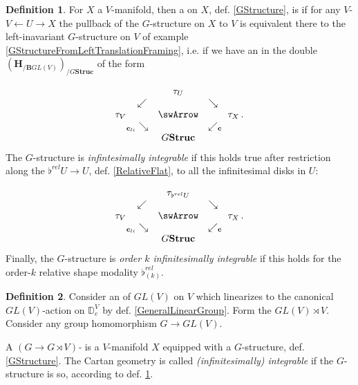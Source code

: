 \documentclass[12pt,titlepage]{article}
\def\mathllap{\mathpalette\mathllapinternal}
\def\mathrlap{\mathpalette\mathrlapinternal}
\def\mathllapinternal#1#2{\llap{$\mathsurround=0pt#1{#2}$}}
\def\mathrlapinternal#1#2{\rlap{$\mathsurround=0pt#1{#2}$}}
\newcommand{\itexarray}[1]{\begin{matrix}#1\end{matrix}}
\theoremstyle{plain}
\theoremstyle{definition}
\newtheorem{defn}{Definition}
\theoremstyle{remark}
\begin{document}
\begin{defn}
\label{IntegrabilityOfGStructure}\hypertarget{IntegrabilityOfGStructure}{}
For $X$ a $V$-manifold, then a  on $X$, def. \ref{GStructure}, is \emph{} if for any $V$- $V \leftarrow U \rightarrow X$ the pullback of the $G$-structure on $X$ to $V$ is equivalent there to the left-inavariant $G$-structure on $V$ of example \ref{GStructureFromLeftTranslationFraming}, i.e. if we have an  in the double  $(\mathbf{H}_{/\mathbf{B}GL(V)})_{/G\mathbf{Struc}}$ of the form

\begin{displaymath}
\itexarray{
     && \tau_U
     \\
     & \swarrow && \searrow
     \\
     \tau_V && \swArrow && \tau_X
     \\
     & {}_{\mathllap{\mathbf{c}_{li}}}\searrow && \swarrow_{\mathrlap{\mathbf{c}}}
     \\
     && G \mathbf{Struc}
  }
  \,.
\end{displaymath}
The $G$-structure is \emph{infintesimally integrable} if this holds true after restriction along the  $\flat^{rel} U \to U$, def. \ref{RelativeFlat}, to all the infinitesimal disks in $U$:

\begin{displaymath}
\itexarray{
     && \tau_{\flat^{rel}U}
     \\
     & \swarrow && \searrow
     \\
     \tau_V && \swArrow && \tau_X
     \\
     & {}_{\mathllap{\mathbf{c}_{li}}}\searrow && \swarrow_{\mathrlap{\mathbf{c}}}
     \\
     && G \mathbf{Struc}
  }
  \,.
\end{displaymath}
Finally, the $G$-structure is \emph{order $k$ infinitesimally integrable} if this holds for the order-$k$ relative shape modality $\flat^{rel}_{(k)}$.

\end{defn}
\begin{defn}
\label{CartanGeometry}\hypertarget{CartanGeometry}{}
Consider an  of $GL(V)$ on $V$ which linearizes to the canonical $GL(V)$-action on $\mathbb{D}^V_e$ by def. \ref{GeneralLinearGroup}. Form the  $GL(V) \rtimes V$. Consider any group homomorphism $G\to GL(V)$.

A \emph{$(G\to G\rtimes V)$-} is a $V$-manifold $X$ equipped with a $G$-structure, def. \ref{GStructure}. The Cartan geometry is called \emph{(infinitesimally) integrable} if the $G$-structure is so, according to def. \ref{IntegrabilityOfGStructure}.

\end{defn}
\end{document}
